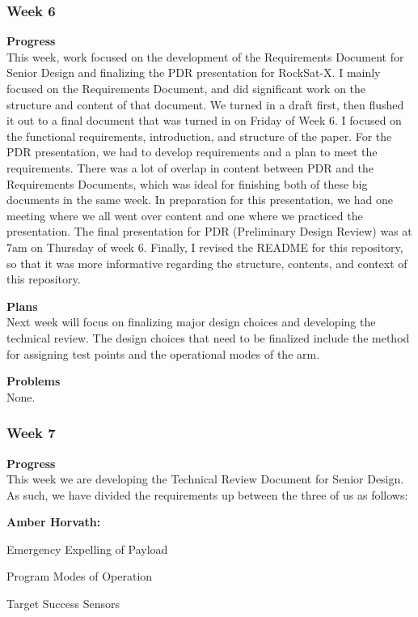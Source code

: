 \subsubsection{Week 6}
\textbf{Progress} \\
This week, work focused on the development of the Requirements Document for Senior Design and finalizing the PDR presentation for RockSat-X. I mainly focused on the Requirements Document, and did significant work on the structure and content of that document. We turned in a draft first, then flushed it out to a final document that was turned in on Friday of Week 6. I focused on the functional requirements, introduction, and structure of the paper. For the PDR presentation, we had to develop requirements and a plan to meet the requirements. There was a lot of overlap in content between PDR and the Requirements Documents, which was ideal for finishing both of these big documents in the same week. In preparation for this presentation, we had one meeting where we all went over content and one where we practiced the presentation. The final presentation for PDR (Preliminary Design Review) was at 7am on Thursday of week 6. Finally, I revised the README for this repository, so that it was more informative regarding the structure, contents, and context of this repository.

\textbf{Plans} \\
Next week will focus on finalizing major design choices and developing the technical review. The design choices that need to be finalized include the method for assigning test points and the operational modes of the arm.

\textbf{Problems} \\
None.

\subsubsection{Week 7}
\textbf{Progress} \\
This week we are developing the Technical Review Document for Senior Design. As such, we have divided the requirements up between the three of us as follows:

\textbf{Amber Horvath:}

    Emergency Expelling of Payload

    Program Modes of Operation

    Target Success Sensors

